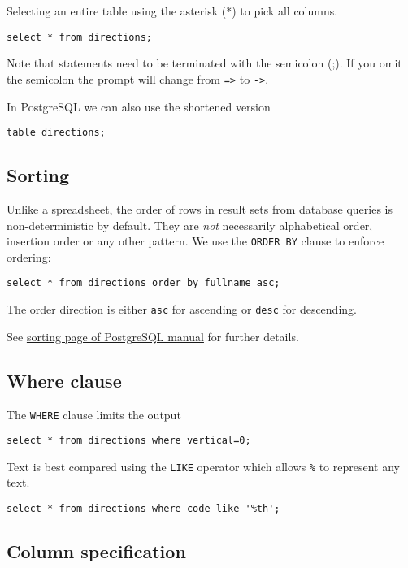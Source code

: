 \documentclass{pgnotes}
\begin{document}
Selecting an entire table using the asterisk (*) to pick all columns.
\begin{verbatim}
select * from directions;
\end{verbatim}
Note that statements need to be terminated with the semicolon (;).
If you omit the semicolon the prompt will change from \texttt{=>} to \texttt{->}.

In PostgreSQL we can also use the shortened version
\begin{verbatim}
table directions;
\end{verbatim}

\subsection{Sorting}

Unlike a spreadsheet, the order of rows in result sets from database queries is non-deterministic by default.
They are \textit{not} necessarily alphabetical order, insertion order or any other pattern.
We use the \texttt{ORDER BY} clause to enforce ordering:

\begin{verbatim}
select * from directions order by fullname asc;
\end{verbatim}

The order direction is either \texttt{asc} for ascending or \texttt{desc} for descending.

See \href{https://www.postgresql.org/docs/13/queries-order.html}{sorting page of PostgreSQL manual} for further details.

\subsection{Where clause}

The \texttt{WHERE} clause limits the output
\begin{verbatim}
select * from directions where vertical=0;
\end{verbatim}
Text is best compared using the \texttt{LIKE} operator which allows \texttt{\%} to represent any text.
\begin{verbatim}
select * from directions where code like '%th'; 
\end{verbatim}

\subsection{Column specification}
\end{document}

